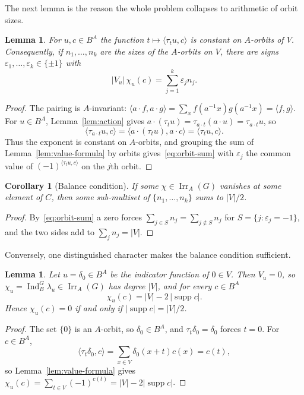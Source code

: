 \documentclass[11pt]{article}
\newtheorem{lemma}[theorem]{Lemma}
\newtheorem{corollary}[theorem]{Corollary}
\theoremstyle{definition}
\theoremstyle{remark}
\newcommand{\Irr}{\operatorname{Irr}}
\newcommand{\Ind}{\operatorname{Ind}}
\newcommand{\supp}{\operatorname{supp}}
\begin{document}
The next lemma is the reason the whole problem collapses to arithmetic
of orbit sizes.

\begin{lemma}\label{lem:orbit-constant}
For $u,c\in B^A$ the function $t\mapsto\langle\tau_tu,c\rangle$ is
constant on $A$-orbits of $V$.  Consequently, if $n_1,\dots,n_k$ are
the sizes of the $A$-orbits on $V$, there are signs
$\varepsilon_1,\dots,\varepsilon_k\in\{\pm1\}$ with
\begin{equation}\label{eq:orbit-sum}
 |V_u|\,\chi_u(c)=\sum_{j=1}^k\varepsilon_jn_j .
\end{equation}
\end{lemma}

\begin{proof}
The pairing is $A$-invariant: $\langle a\cdot f,a\cdot g\rangle
=\sum_xf(a^{-1}x)g(a^{-1}x)=\langle f,g\rangle$.  For $u\in B^A$,
Lemma~\ref{lem:action} gives
$a\cdot(\tau_tu)=\tau_{a\cdot t}(a\cdot u)=\tau_{a\cdot t}u$, so
\[
 \langle\tau_{a\cdot t}u,c\rangle
 =\langle a\cdot(\tau_tu),a\cdot c\rangle
 =\langle\tau_tu,c\rangle .
\]
Thus the exponent is constant on $A$-orbits, and grouping the sum of
Lemma~\ref{lem:value-formula} by orbits gives~\eqref{eq:orbit-sum}
with $\varepsilon_j$ the common value of
$(-1)^{\langle\tau_tu,c\rangle}$ on the $j$th orbit.
\end{proof}

\begin{corollary}[Balance condition]\label{cor:balance}
If some $\chi\in\Irr_A(G)$ vanishes at some element of $C$, then some
sub-multiset of $\{n_1,\dots,n_k\}$ sums to $|V|/2$.
\end{corollary}

\begin{proof}
By~\eqref{eq:orbit-sum} a zero forces
$\sum_{j\in S}n_j=\sum_{j\notin S}n_j$ for $S=\{j:\varepsilon_j=-1\}$,
and the two sides add to $\sum_jn_j=|V|$.
\end{proof}

Conversely, one distinguished character makes the balance condition
sufficient.

\begin{lemma}\label{lem:delta-values}
Let $u=\delta_0\in B^A$ be the indicator function of $0\in V$.  Then
$V_u=0$, so $\chi_u=\Ind_B^G\lambda_u\in\Irr_A(G)$ has degree $|V|$,
and for every $c\in B^A$
\[
 \chi_u(c)=|V|-2\,|\supp c| .
\]
Hence $\chi_u(c)=0$ if and only if $|\supp c|=|V|/2$.
\end{lemma}

\begin{proof}
The set $\{0\}$ is an $A$-orbit, so $\delta_0\in B^A$, and
$\tau_t\delta_0=\delta_0$ forces $t=0$.  For $c\in B^A$,
\[
 \langle\tau_t\delta_0,c\rangle=\sum_{x\in V}\delta_0(x+t)c(x)=c(t),
\]
so Lemma~\ref{lem:value-formula} gives
$\chi_u(c)=\sum_{t\in V}(-1)^{c(t)}=|V|-2|\supp c|$.
\end{proof}
\end{document}
